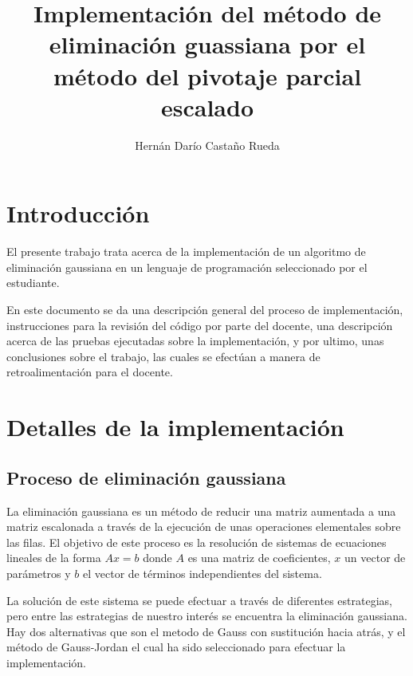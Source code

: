 \documentclass[stu, 12pt, letterpaper, donotrepeattitle, floatsintext, natbib]{apa7}
\title{\Large Implementación del método de eliminación guassiana por el método del pivotaje parcial escalado}
\author{Hernán Darío Castaño Rueda} %
\affiliation{Fundación Universitaria Internacional de la Rioja}
\begin{document}
\maketitle


\renewcommand\contentsname{\largeÍndice}
\tableofcontents
\setcounter{tocdepth}{2}
\newpage


\section{\large Introducción}
El presente trabajo trata acerca de la implementación de un algoritmo de eliminación gaussiana en un lenguaje de programación seleccionado por el estudiante.

En este documento se da una descripción general del proceso de implementación, instrucciones para la revisión del código por parte del docente, una descripción acerca de las pruebas ejecutadas sobre la implementación, y por ultimo, unas conclusiones sobre el trabajo, las cuales se efectúan a manera de retroalimentación para el docente.

\section{\large Detalles de la implementación}
\subsection{Proceso de eliminación gaussiana}
La eliminación gaussiana es un método de reducir una matriz aumentada a una matriz escalonada a través de la ejecución de unas operaciones elementales sobre las filas. El objetivo de este proceso es la resolución de sistemas de ecuaciones lineales de la forma $Ax = b$ donde $A$ es una matriz de coeficientes, $x$ un vector de parámetros y $b$ el vector de términos independientes del sistema.

La solución de este sistema se puede efectuar a través de diferentes estrategias, pero entre las estrategias de nuestro interés se encuentra la eliminación gaussiana. Hay dos alternativas que son el metodo de Gauss con sustitución hacia atrás, y el método de Gauss-Jordan el cual ha sido seleccionado para efectuar la implementación.
\end{document}
